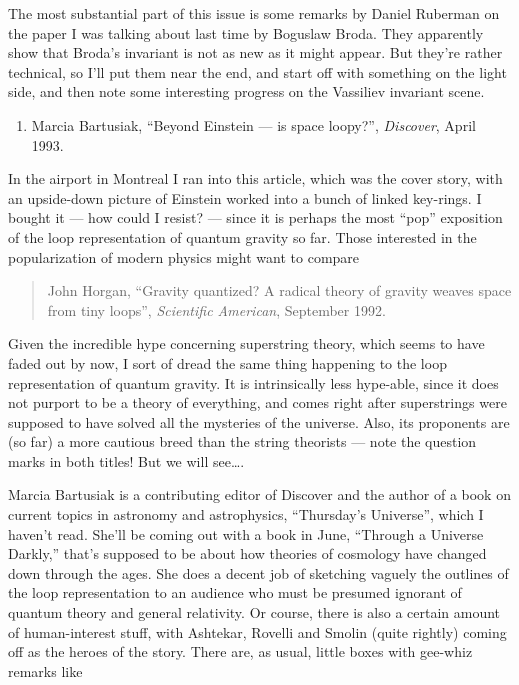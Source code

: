\documentclass{article}
\def\tightlist{}
\begin{document}
The most substantial part of this issue is some remarks by Daniel
Ruberman on the paper I was talking about last time by Boguslaw Broda. They
apparently show that Broda's invariant is not as new as it might appear.
But they're rather technical, so I'll put them near the end, and start
off with something on the light side, and then note some interesting
progress on the Vassiliev invariant scene.

\begin{enumerate}
\def\labelenumi{\arabic{enumi})}
\tightlist
\item
  Marcia Bartusiak, ``Beyond Einstein --- is space loopy?'',
  \emph{Discover}, April 1993.
\end{enumerate}

In the airport in Montreal I ran into this article, which was the cover
story, with an upside-down picture of Einstein worked into a bunch of
linked key-rings. I bought it --- how could I resist? --- since it is
perhaps the most ``pop'' exposition of the loop representation of
quantum gravity so far. Those interested in the popularization of modern
physics might want to compare

\begin{quote}
{\rm John Horgan, ``Gravity quantized? A radical theory of gravity weaves space from tiny
loops'', \emph{Scientific American}, September 1992.}
\end{quote}

Given the incredible hype concerning superstring theory, which seems to
have faded out by now, I sort of dread the same thing happening to the
loop representation of quantum gravity. It is intrinsically less
hype-able, since it does not purport to be a theory of everything, and
comes right after superstrings were supposed to have solved all the
mysteries of the universe. Also, its proponents are (so far) a more
cautious breed than the string theorists --- note the question marks in
both titles! But we will see\ldots.

Marcia Bartusiak is a contributing editor of Discover and the author of
a book on current topics in astronomy and astrophysics, ``Thursday's
Universe'', which I haven't read. She'll be coming out with a book in
June, ``Through a Universe Darkly,'' that's supposed to be about how
theories of cosmology have changed down through the ages. She does a
decent job of sketching vaguely the outlines of the loop representation
to an audience who must be presumed ignorant of quantum theory and
general relativity. Or course, there is also a certain amount of
human-interest stuff, with Ashtekar, Rovelli and Smolin (quite rightly)
coming off as the heroes of the story. There are, as usual, little boxes
with gee-whiz remarks like
\end{document}
